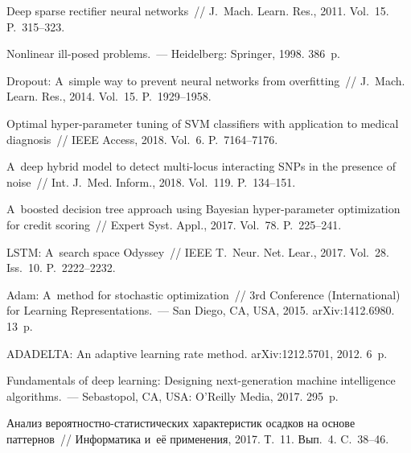 \begin{multicols}{2}
{{\begin{thebibliography}{99}
  Deep sparse rectifier neural
networks~// J.~Mach. Learn. Res., 2011. Vol.~15. P.~315--323.

   
Nonlinear ill-posed problems.~--- Heidelberg: Springer, 1998. 386~p.

   Dropout: A~simple way to prevent neural networks from 
overfitting~// J.~Mach. Learn. Res., 2014. Vol.~15. P.~1929--1958.

  
Optimal hyper-parameter tuning of SVM classifiers with application 
to medical diagnosis~// IEEE Access, 2018. Vol.~6. P.~7164--7176.

 
 A~deep hybrid model to detect multi-locus interacting SNPs in the presence of noise~// 
 Int. J.~Med. Inform., 2018. Vol.~119. P.~134--151.

  
A~boosted decision tree approach using Bayesian hyper-parameter optimization 
for credit scoring~// Expert Syst. Appl., 2017. Vol.~78. P.~225--241.

  LSTM: A~search space Odyssey~// 
IEEE T.~Neur. Net. Lear., 2017. Vol.~28. Iss.~10. P.~2222--2232.

    Adam: A~method for stochastic 
optimization~// 
3rd  Conference (International)
for Learning Representations.~--- San Diego, CA, USA, 2015.  \mbox{arXiv}:1412.6980. 13~p.

   
ADADELTA: An adaptive learning rate method. arXiv:1212.5701, 2012. 6~p.

   Fundamentals of deep learning: Designing 
next-generation machine intelligence algorithms.~--- 
Sebastopol, CA, USA: O'Reilly Media, 2017. 295~p.

  Анализ
вероятностно-статистических характеристик осадков на основе паттернов~//
Информатика и~её применения, 2017. Т.~11. Вып.~4. C.~38--46.

 \end{thebibliography}

 }
 }

\end{multicols}

